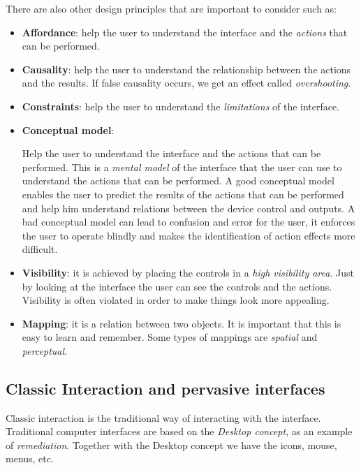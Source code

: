 \documentclass[11pt,a4paper]{article}
\theoremstyle{definition}
\theoremstyle{plain}
\theoremstyle{remark}
\begin{document}
There are also other design principles that are important to consider such as:
\begin{itemize}
    \item \textbf{Affordance}: help the user to understand the interface and the \textit{actions} that can be performed.
    \item \textbf{Causality}: help the user to understand the relationship between the actions and the results. If false causality occurs,
    we get an effect called \textit{overshooting}.
    \item \textbf{Constraints}: help the user to understand the \textit{limitations} of the interface.
    \item \textbf{Conceptual model}: 
    \begin{tcolorbox}[colback=violet!5!white,colframe=violet!75!black,title=\textbf{Conceptual Model}]
    Help the user to understand the interface and the actions that can be performed. 
    This is a \textit{mental model} of the interface that the user can use to understand the actions that can be performed.
    A good conceptual model enables the user to predict the results of the actions that can be performed and help him understand
    relations between the device control and outputs.
    A bad conceptual model can lead to confusion and error for the user, it enforces the user to operate blindly and makes
    the identification of action effects more difficult.
    \end{tcolorbox}
    \item \textbf{Visibility}: it is achieved by placing the controls in a \textit{high visibility area}. Just by looking
    at the interface the user can see the controls and the actions. Visibility is often violated in order to make things look more appealing.
    \item \textbf{Mapping}: it is a relation between two objects. It is important that this is easy to 
    learn and remember. Some types of mappings are \textit{spatial} and \textit{perceptual}.
    
\end{itemize}
\subsection{Classic Interaction and pervasive interfaces}
Classic interaction is the traditional way of interacting with the interface. 
Traditional computer interfaces are based on the \textit{Desktop concept}, as an example of 
\textit{remediation}. Together with the Desktop concept we have the icons, mouse, menus, etc.
\end{document}
